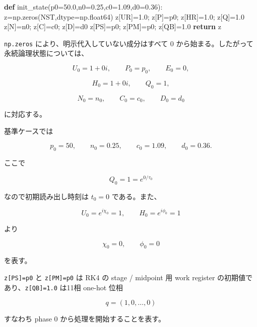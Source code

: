 \documentclass[
  a4paper,
]{ltjsarticle}
\newenvironment{Shaded}{}{}
\newcommand{\ControlFlowTok}[1]{\textcolor[rgb]{0.00,0.44,0.13}{\textbf{#1}}}
\newcommand{\FloatTok}[1]{\textcolor[rgb]{0.25,0.63,0.44}{#1}}
\newcommand{\KeywordTok}[1]{\textcolor[rgb]{0.00,0.44,0.13}{\textbf{#1}}}
\newcommand{\NormalTok}[1]{#1}
\newcommand{\OperatorTok}[1]{\textcolor[rgb]{0.40,0.40,0.40}{#1}}
\begin{document}
\begin{Shaded}
\begin{Highlighting}[]
\KeywordTok{def}\NormalTok{ init\_state(p0}\OperatorTok{=}\FloatTok{50.0}\NormalTok{,n0}\OperatorTok{=}\FloatTok{0.25}\NormalTok{,c0}\OperatorTok{=}\FloatTok{1.09}\NormalTok{,d0}\OperatorTok{=}\FloatTok{0.36}\NormalTok{):}
\NormalTok{    z}\OperatorTok{=}\NormalTok{np.zeros(NST,dtype}\OperatorTok{=}\NormalTok{np.float64)}
\NormalTok{    z[UR]}\OperatorTok{=}\FloatTok{1.0}\OperatorTok{;}\NormalTok{ z[P]}\OperatorTok{=}\NormalTok{p0}\OperatorTok{;}\NormalTok{ z[HR]}\OperatorTok{=}\FloatTok{1.0}\OperatorTok{;}\NormalTok{ z[Q]}\OperatorTok{=}\FloatTok{1.0}
\NormalTok{    z[N]}\OperatorTok{=}\NormalTok{n0}\OperatorTok{;}\NormalTok{ z[C]}\OperatorTok{=}\NormalTok{c0}\OperatorTok{;}\NormalTok{ z[D]}\OperatorTok{=}\NormalTok{d0}
\NormalTok{    z[PS]}\OperatorTok{=}\NormalTok{p0}\OperatorTok{;}\NormalTok{ z[PM]}\OperatorTok{=}\NormalTok{p0}\OperatorTok{;}\NormalTok{ z[QB]}\OperatorTok{=}\FloatTok{1.0}
    \ControlFlowTok{return}\NormalTok{ z}
\end{Highlighting}
\end{Shaded}

\texttt{np.zeros} により、明示代入していない成分はすべて 0
から始まる。したがって永続論理状態については、

\[
U_0=1+0i,
\qquad
P_0=p_0,
\qquad
E_0=0,
\]

\[
H_0=1+0i,
\qquad
Q_0=1,
\]

\[
N_0=n_0,
\qquad
C_0=c_0,
\qquad
D_0=d_0
\]

に対応する。

基準ケースでは

\[
p_0=50,
\qquad
n_0=0.25,
\qquad
c_0=1.09,
\qquad
d_0=0.36.
\]

ここで

\[
Q_0=1=e^{0/\tau_0}
\]

なので初期読み出し時刻は \(t_0=0\) である。また、

\[
U_0=e^{i\chi_0}=1,
\qquad
H_0=e^{i\phi_0}=1
\]

より

\[
\chi_0=0,
\qquad
\phi_0=0
\]

を表す。

\texttt{z{[}PS{]}=p0} と \texttt{z{[}PM{]}=p0} は RK4 の stage /
midpoint 用 work register の初期値であり、\texttt{z{[}QB{]}=1.0} は11相
one-hot 位相

\[
q=(1,0,\ldots,0)
\]

すなわち phase 0 から処理を開始することを表す。
\end{document}
